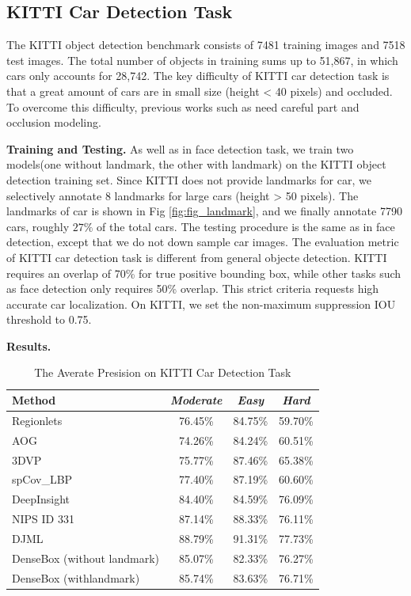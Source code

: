  
\subsection{ KITTI Car Detection Task}
The KITTI object detection benchmark consists of 7481 training images and 7518 test images. The total number of objects in training sums up to 51,867, in which cars only accounts for 28,742. The key difficulty of KITTI car detection task is that a great amount of cars are in small size (height < 40 pixels) and occluded.  To overcome this difficulty,  previous works such as\cite{li2014integrating} need careful part and occlusion modeling. 

\textbf{Training and Testing.} As well as in face detection task, we train two models(one without landmark, the other with landmark) on the KITTI object detection training set. Since KITTI does not provide landmarks for car, we selectively annotate 8 landmarks for large cars (height > 50 pixels). The landmarks of car is shown in Fig \ref{fig:fig_landmark}, and we finally annotate 7790 cars, roughly $27\%$ of the total cars. The testing procedure is the same as in face detection, except that we do not down sample car images. The evaluation metric of KITTI car detection task is different from general objecte detection. KITTI requires an overlap of 70\% for true positive bounding box, while other tasks such as face detection only requires 50\% overlap. This strict criteria requests high accurate car localization. On KITTI, we set the non-maximum suppression  IOU threshold to 0.75. 

\textbf{Results.} 

	\renewcommand{\arraystretch}{1.5}
	\begin{table}[!hbt]
	\centering
	\begin{tabular}{|l|c|c|c|}
	\hline

	Method & \textit{Moderate} &\textit{Easy} & \textit{Hard}\\
	\hline
	Regionlets~\cite{long2015accurate}	 &76.45\%	  &84.75\%	  &59.70\% 	 \\ 
	AOG~\cite{li2014integrating}	&74.26\%	&84.24\% 		&60.51\% \\
	3DVP~\cite{xiang2015data}			&75.77\%	&87.46\%	&65.38\%       \\
	spCov\_LBP 	&77.40\%	&87.19\%	&60.60\%   \\
	DeepInsight	&84.40\%	&84.59\%	&76.09\%     \\
	NIPS ID 331	&87.14\%	&88.33\%	&76.11\% \\
	DJML	&88.79\%	&91.31\%	&77.73\% \\
	\hline
	
	\hline
	DenseBox (without landmark)	&85.07\%	&82.33\%	&76.27\%   \\
	DenseBox (withlandmark)		&85.74\%	&83.63\%	&76.71\%     \\
 
	\hline
	\end{tabular}
	\caption{The Averate Presision on KITTI Car Detection Task} 
	\label{tab:tab_kitti}
	\end{table}

